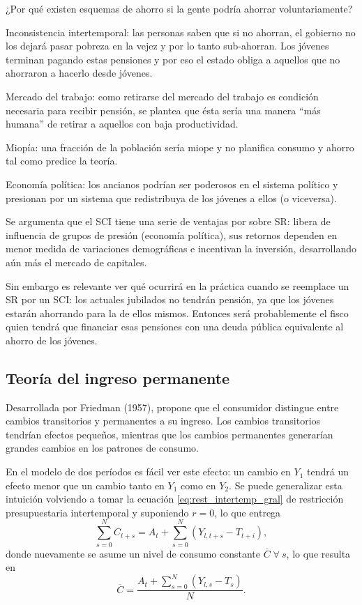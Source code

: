 \documentclass[DeGregorioResumen]{subfiles}
\begin{document}
¿Por qué existen esquemas de ahorro si la gente podría ahorrar voluntariamente?

\begin{enumdescript}
\item [Inconsistencia intertemporal:] las personas saben que si no ahorran, el gobierno no los dejará pasar pobreza en la vejez y por lo tanto sub-ahorran. Los jóvenes terminan pagando estas pensiones y por eso el estado obliga a aquellos que no ahorraron a hacerlo desde jóvenes.
\item [Mercado del trabajo:] como retirarse del mercado del trabajo es condición necesaria para recibir pensión, se plantea que ésta sería una manera ``más humana'' de retirar a aquellos con baja productividad.
\item [Miopía:] una fracción de la población sería miope y no planifica consumo y ahorro tal como predice la teoría.
\item [Economía política:] los ancianos podrían ser poderosos en el sistema político y presionan por un sistema que redistribuya de los jóvenes a ellos (o viceversa).
\end{enumdescript}

Se argumenta que el SCI tiene una serie de ventajas por sobre SR: libera de influencia de grupos de presión (economía política), sus retornos dependen en menor medida de variaciones demográficas e incentivan la inversión, desarrollando aún más el mercado de capitales.

Sin embargo es relevante ver qué ocurrirá en la práctica cuando se reemplace un SR por un SCI:    los actuales jubilados no tendrán pensión, ya que los jóvenes estarán ahorrando para la de ellos mismos. Entonces será probablemente el fisco quien tendrá que financiar esas pensiones con una deuda pública equivalente al ahorro de los jóvenes.

\subsection{Teoría del ingreso permanente}

Desarrollada por Friedman (1957), propone que el consumidor distingue entre cambios transitorios y permanentes a su ingreso. Los cambios transitorios tendrían efectos pequeños, mientras que los cambios permanentes generarían grandes cambios en los patrones de consumo.

En el modelo de dos períodos es fácil ver este efecto: un cambio en $Y_1$ tendrá un efecto menor que un cambio tanto en $Y_1$ como en $Y_2$. Se puede generalizar esta intuición volviendo a tomar la ecuación \eqref{eq:rest_intertemp_gral} de restricción presupuestaria intertemporal y suponiendo $r=0$, lo que entrega
\begin{equation*}
\sum_{s=0}^{N}{C_{t+s}} = A_t + \sum_{s=0}^{N}{(Y_{l,t+s}-T_{t+i})},
\end{equation*}
donde nuevamente se asume un nivel de consumo constante $\overline{C} \; \forall \: s$, lo que resulta en
\begin{equation}
\overline{C}=\frac{A_t+\sum_{s=0}^{N}{(Y_{l,s}-T_s)}}{N}.
\end{equation}
\end{document}

